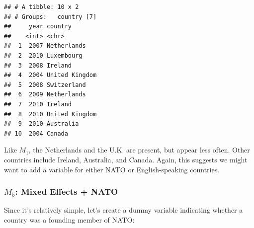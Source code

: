 \documentclass[11pt,]{article}
\newenvironment{Shaded}{\begin{snugshade}}{\end{snugshade}}
\newcommand{\DataTypeTok}[1]{\textcolor[rgb]{0.13,0.29,0.53}{#1}}
\newcommand{\DecValTok}[1]{\textcolor[rgb]{0.00,0.00,0.81}{#1}}
\newcommand{\KeywordTok}[1]{\textcolor[rgb]{0.13,0.29,0.53}{\textbf{#1}}}
\newcommand{\NormalTok}[1]{#1}
\newcommand{\OperatorTok}[1]{\textcolor[rgb]{0.81,0.36,0.00}{\textbf{#1}}}
\newcommand{\StringTok}[1]{\textcolor[rgb]{0.31,0.60,0.02}{#1}}
\begin{document}
\begin{Shaded}
\end{Shaded}

\begin{verbatim}
## # A tibble: 10 x 2
## # Groups:   country [7]
##     year country       
##    <int> <chr>         
##  1  2007 Netherlands   
##  2  2010 Luxembourg    
##  3  2008 Ireland       
##  4  2004 United Kingdom
##  5  2008 Switzerland   
##  6  2009 Netherlands   
##  7  2010 Ireland       
##  8  2010 United Kingdom
##  9  2010 Australia     
## 10  2004 Canada
\end{verbatim}

Like \(M_1\), the Netherlands and the U.K. are present, but appear less
often. Other countries include Ireland, Australia, and Canada. Again,
this suggests we might want to add a variable for either NATO or
English-speaking countries.

\hypertarget{m_5-mixed-effects-nato}{%
\subsubsection{\texorpdfstring{\(M_5\): Mixed Effects +
NATO}{M\_5: Mixed Effects + NATO}}\label{m_5-mixed-effects-nato}}

Since it's relatively simple, let's create a dummy variable indicating
whether a country was a founding member of NATO:
\end{document}
